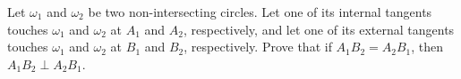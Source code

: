 Let $\omega_1$ and $\omega_2$ be two non-intersecting circles. Let one of its internal tangents touches $\omega_1$ and $\omega_2$ at $A_1$ and $A_2$, respectively, and let one of its external tangents touches $\omega_1$ and $\omega_2$ at $B_1$ and $B_2$, respectively. Prove that if $A_1B_2 = A_2B_1$, then   $A_1B_2 \perp A_2B_1$.